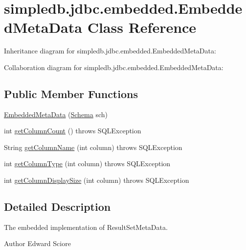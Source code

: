 \hypertarget{classsimpledb_1_1jdbc_1_1embedded_1_1EmbeddedMetaData}{}\section{simpledb.\+jdbc.\+embedded.\+Embedded\+Meta\+Data Class Reference}
\label{classsimpledb_1_1jdbc_1_1embedded_1_1EmbeddedMetaData}


Inheritance diagram for simpledb.\+jdbc.\+embedded.\+Embedded\+Meta\+Data\+:


Collaboration diagram for simpledb.\+jdbc.\+embedded.\+Embedded\+Meta\+Data\+:
\subsection*{Public Member Functions}
\begin{DoxyCompactItemize}
\item 
\hyperlink{classsimpledb_1_1jdbc_1_1embedded_1_1EmbeddedMetaData_a91ade54d80ce7b048eb85732279491d1}{Embedded\+Meta\+Data} (\hyperlink{classsimpledb_1_1record_1_1Schema}{Schema} sch)
\item 
int \hyperlink{classsimpledb_1_1jdbc_1_1embedded_1_1EmbeddedMetaData_a705a129ea1ffb4bd59f19c338f5c0edb}{get\+Column\+Count} ()  throws S\+Q\+L\+Exception 
\item 
String \hyperlink{classsimpledb_1_1jdbc_1_1embedded_1_1EmbeddedMetaData_a090cf18d364fe42ec078e85745ecd270}{get\+Column\+Name} (int column)  throws S\+Q\+L\+Exception 
\item 
int \hyperlink{classsimpledb_1_1jdbc_1_1embedded_1_1EmbeddedMetaData_a2b5e8a6fa3cc530acce45e1399c903c5}{get\+Column\+Type} (int column)  throws S\+Q\+L\+Exception 
\item 
int \hyperlink{classsimpledb_1_1jdbc_1_1embedded_1_1EmbeddedMetaData_a9939060dea7987e5b26535c2db9d503c}{get\+Column\+Display\+Size} (int column)  throws S\+Q\+L\+Exception 
\end{DoxyCompactItemize}


\subsection{Detailed Description}
The embedded implementation of Result\+Set\+Meta\+Data. \begin{DoxyAuthor}{Author}
Edward Sciore 
\end{DoxyAuthor}


